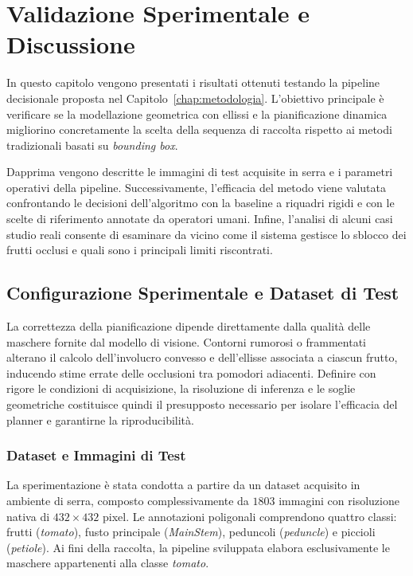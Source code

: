 \chapter{Validazione Sperimentale e Discussione}
\label{chap:validazione}

In questo capitolo vengono presentati i risultati ottenuti testando la 
pipeline decisionale proposta nel Capitolo~\ref{chap:metodologia}. L'obiettivo 
principale è verificare se la modellazione geometrica con ellissi e la pianificazione 
dinamica migliorino concretamente la scelta della sequenza di raccolta 
rispetto ai metodi tradizionali basati su \textit{bounding box}.

Dapprima vengono descritte le immagini di test acquisite in serra e i 
parametri operativi della pipeline. Successivamente, l'efficacia del metodo 
viene valutata confrontando le decisioni dell'algoritmo con la baseline a 
riquadri rigidi e con le scelte di riferimento annotate da operatori umani. 
Infine, l'analisi di alcuni casi studio reali consente di esaminare da vicino 
come il sistema gestisce lo sblocco dei frutti occlusi e quali sono i 
principali limiti riscontrati.

\section{Configurazione Sperimentale e Dataset di Test}
\label{sec:setup_sperimentale}

La correttezza della pianificazione dipende direttamente dalla qualità 
delle maschere fornite dal modello di visione. Contorni rumorosi o 
frammentati alterano il calcolo dell'involucro convesso e dell'ellisse 
associata a ciascun frutto, inducendo stime errate delle occlusioni 
tra pomodori adiacenti. Definire con rigore le condizioni di acquisizione, 
la risoluzione di inferenza e le soglie geometriche costituisce quindi 
il presupposto necessario per isolare l'efficacia del planner e 
garantirne la riproducibilità.


\subsection{Dataset e Immagini di Test}
\label{subsec:dataset}

La sperimentazione è stata condotta a partire da un dataset acquisito in 
ambiente di serra, composto complessivamente da $1803$ immagini con 
risoluzione nativa di $432 \times 432$ pixel. Le annotazioni poligonali 
comprendono quattro classi: frutti (\textit{tomato}), fusto principale 
(\textit{MainStem}), peduncoli (\textit{peduncle}) e piccioli 
(\textit{petiole}). Ai fini della raccolta, la pipeline sviluppata elabora 
esclusivamente le maschere appartenenti alla classe \textit{tomato}.


